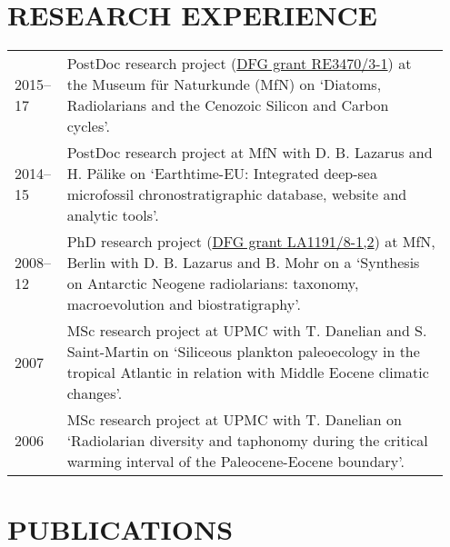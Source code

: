\documentclass[11pt, a4paper]{article}
\begin{document}
\section{RESEARCH EXPERIENCE}
\begin{longtable}{p{0.1\linewidth} P{0.85\linewidth}}
2015--17 & PostDoc research project (\href{http://gepris.dfg.de/gepris/projekt/279867559}{DFG grant RE3470/3-1}) at the Museum f\"{u}r Naturkunde (MfN) on `Diatoms, Radiolarians and the Cenozoic Silicon and Carbon cycles'.\\
2014--15 & PostDoc research project at MfN with D. B. Lazarus and H. P\"{a}like on `Earthtime-EU: Integrated deep-sea microfossil chronostratigraphic database, website and analytic tools'.\\
2008--12 & PhD research project (\href{http://gepris.dfg.de/gepris/projekt/84744046}{DFG grant LA1191/8-1,2}) at MfN, Berlin with D. B. Lazarus and B. Mohr on a `Synthesis on Antarctic Neogene radiolarians: taxonomy, macroevolution and biostratigraphy'.\\
2007 & MSc research project at UPMC with T. Danelian and S. Saint-Martin on `Siliceous plankton paleoecology in the tropical Atlantic in relation with Middle Eocene climatic changes'.\\
2006 & MSc research project at UPMC with T. Danelian on `Radiolarian diversity and taphonomy during the critical warming interval of the Paleocene-Eocene boundary'.\\
\end{longtable}

\section{PUBLICATIONS}
\end{document}

